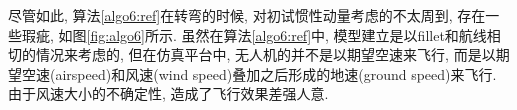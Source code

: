     尽管如此, 算法\ref{algo6:ref}在转弯的时候, 对初试惯性动量考虑的不太周到, 存在一些瑕疵, 如图\ref{fig:algo6}所示.
    虽然在算法\ref{algo6:ref}中, 模型建立是以fillet和航线相切的情况来考虑的, 但在仿真平台中, 无人机的并不是以期望空速来飞行, 而是以期望空速(airspeed)和风速(wind speed)叠加之后形成的地速(ground speed)来飞行. 由于风速大小的不确定性, 造成了飞行效果差强人意.
    \begin{figure}[htbp]
        \centering
\end{figure}
